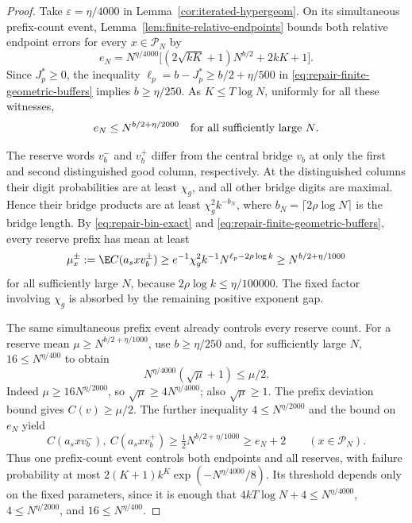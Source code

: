 \begin{proof}
Take \(\varepsilon=\eta/4000\) in
Lemma~\ref{cor:iterated-hypergeom}.  On its simultaneous
prefix-count event, Lemma~\ref{lem:finite-relative-endpoints} bounds
both relative endpoint errors for every \(x\in\mathcal P_N\)
by
\[
 e_N=N^{\eta/4000}
       \bigl[(2\sqrt{kK}+1)N^{b/2}+2kK+1\bigr].
\]
Since \(J_p^*\ge0\), the inequality
\(\ell_p=b-J_p^*\ge b/2+\eta/500\) in
\eqref{eq:repair-finite-geometric-buffers} implies \(b\ge\eta/250\).
As \(K\le T\log N\), uniformly for all these witnesses,
\begin{equation}
\label{eq:repair-endpoint-error-concrete}
 e_N\le N^{b/2+\eta/2000}
 \quad\hbox{for all sufficiently large \(N\)}.
\end{equation}

The reserve words \(v_b^-\) and \(v_b^+\) differ from the central
bridge \(v_b\) at only the first and second distinguished good
column, respectively.  At the distinguished columns their digit
probabilities are at least \(\chi_g\), and all other bridge digits
are maximal.  Hence their bridge products are at least
\(\chi_g^2k^{-b_N}\), where
\(b_N=\lceil 2\rho\log N\rceil\) is the bridge length.  By
\eqref{eq:repair-bin-exact} and
\eqref{eq:repair-finite-geometric-buffers}, every reserve prefix has
mean at least
\[
 \mu_x^\pm:=\E C(a_sxv_b^\pm)
 \ge e^{-1}\chi_g^2 k^{-1}
       N^{\ell_p-2\rho\log k}
 \ge N^{b/2+\eta/1000}
\]
for all sufficiently large \(N\), because
\(2\rho\log k\le\eta/100000\).  The fixed factor involving
\(\chi_g\) is absorbed by the remaining positive exponent gap.

The same simultaneous prefix event already controls every reserve count.
For a reserve mean $\mu\ge N^{b/2+\eta/1000}$, use $b\ge\eta/250$ and,
for sufficiently large $N$, $16\le N^{\eta/400}$ to obtain
\[
 N^{\eta/4000}(\sqrt\mu+1)\le\mu/2.
\]
Indeed $\mu\ge16N^{\eta/2000}$, so $\sqrt\mu\ge4N^{\eta/4000}$;
also $\sqrt\mu\ge1$. The prefix deviation bound gives $C(v)\ge\mu/2$.
The further inequality $4\le N^{\eta/2000}$ and the bound on $e_N$ yield
\begin{equation}\label{eq:repair-reserve-count-dominates}
 C(a_sxv_b^-),\ C(a_sxv_b^+)\ge\tfrac12N^{b/2+\eta/1000}
                           \ge e_N+2
 \qquad(x\in\mathcal P_N).
\end{equation}
Thus one prefix-count event controls both endpoints and all reserves,
with failure probability at most
$2(K+1)k^K\exp(-N^{\eta/4000}/8)$. Its threshold depends only on the
fixed parameters, since it is enough that
$4kT\log N+4\le N^{\eta/4000}$, $4\le N^{\eta/2000}$, and
$16\le N^{\eta/400}$.


\end{proof}
